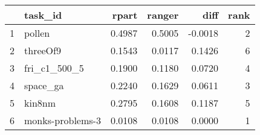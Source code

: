 \begin{table}[ht]
\centering
\begin{tabular}{rlrrrr}
  \hline
 & task\_id & rpart & ranger & diff & rank \\ 
  \hline
1 & pollen & 0.4987 & 0.5005 & -0.0018 &     2 \\ 
  2 & threeOf9 & 0.1543 & 0.0117 & 0.1426 &     6 \\ 
  3 & fri\_c1\_500\_5 & 0.1900 & 0.1180 & 0.0720 &     4 \\ 
  4 & space\_ga & 0.2240 & 0.1629 & 0.0611 &     3 \\ 
  5 & kin8nm & 0.2795 & 0.1608 & 0.1187 &     5 \\ 
  6 & monks-problems-3 & 0.0108 & 0.0108 & 0.0000 &     1 \\ 
   \hline
\end{tabular}
\end{table}
